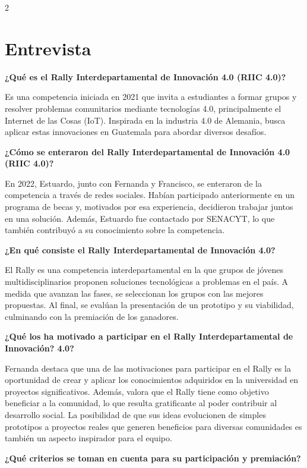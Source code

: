 \documentclass[12pt,spanish,Letterpaper,openany]{book}
\begin{document}
\begin {multicols}{2}

\hypertarget{entrevista-1}{%
\section{Entrevista}\label{entrevista-1}}

\textbf{¿Qué es el Rally Interdepartamental de Innovación 4.0 (RIIC 4.0)?}

Es una competencia iniciada en 2021 que invita a estudiantes a formar grupos y resolver problemas comunitarios mediante tecnologías 4.0, principalmente el Internet de las Cosas (IoT). Inspirada en la industria 4.0 de Alemania, busca aplicar estas innovaciones en Guatemala para abordar diversos desafíos.

\textbf{¿Cómo se enteraron del Rally Interdepartamental de Innovación 4.0 (RIIC 4.0)?}

En 2022, Estuardo, junto con Fernanda y Francisco, se enteraron de la competencia a través de redes sociales. Habían participado anteriormente en un programa de becas y, motivados por esa experiencia, decidieron trabajar juntos en una solución. Además, Estuardo fue contactado por SENACYT, lo que también contribuyó a su conocimiento sobre la competencia.

\textbf{¿En qué consiste el Rally Interdepartamental de Innovación 4.0?}

El Rally es una competencia interdepartamental en la que grupos de jóvenes multidisciplinarios proponen soluciones tecnológicas a problemas en el país. A medida que avanzan las fases, se seleccionan los grupos con las mejores propuestas. Al final, se evalúan la presentación de un prototipo y su viabilidad, culminando con la premiación de los ganadores.

\textbf{¿Qué los ha motivado a participar en el Rally Interdepartamental de Innovación? 4.0?}

Fernanda destaca que una de las motivaciones para participar en el Rally es la oportunidad de crear y aplicar los conocimientos adquiridos en la universidad en proyectos significativos. Además, valora que el Rally tiene como objetivo beneficiar a la comunidad, lo que resulta gratificante al poder contribuir al desarrollo social. La posibilidad de que sus ideas evolucionen de simples prototipos a proyectos reales que generen beneficios para diversas comunidades es también un aspecto inspirador para el equipo.

\textbf{¿Qué criterios se toman en cuenta para su participación y premiación?}


\end{multicols}
\end{document}
